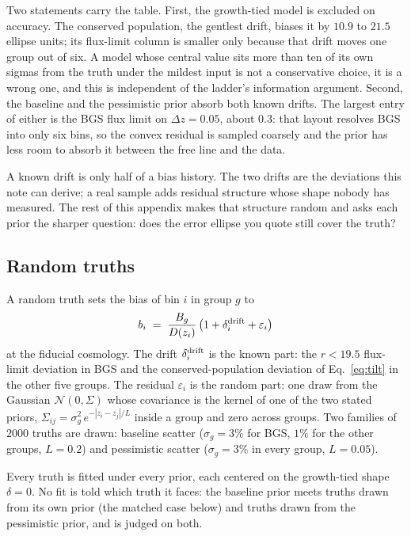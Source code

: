 \documentclass[11pt]{article}
\begin{document}
Two statements carry the table.  First, the growth-tied model is excluded
on accuracy.  The conserved population, the gentlest drift, biases it
by $10.9$ to $21.5$ ellipse units; its flux-limit column is smaller
only because that drift moves one group out of six.  A model whose
central value sits more than ten of its own sigmas from the truth
under the mildest input is not a conservative choice, it is a wrong
one, and this is independent of the ladder's information argument.
Second, the baseline and the pessimistic prior absorb both known
drifts.  The largest entry of either is the BGS flux limit on
$\Delta z = 0.05$, about $0.3$: that layout resolves BGS into only
six bins, so the convex residual is sampled coarsely and the prior
has less room to absorb it between the free line and the data.

A known drift is only half of a bias history.  The two drifts are
the deviations this note can derive; a real sample adds residual
structure whose shape nobody has measured.  The rest of this
appendix makes that structure random and asks each prior the sharper
question: does the error ellipse you quote still cover the truth?

\subsection{Random truths}
\label{sec:randomtruths}

A random truth sets the bias of bin $i$ in group $g$ to
\begin{equation}
  b_i \;=\; \frac{B_g}{D(z_i)}\,
  \bigl(1 + \delta_i^{\rm drift} + \varepsilon_i\bigr)
  \label{eq:randomtruth}
\end{equation}
at the fiducial cosmology.  The drift $\delta_i^{\rm drift}$ is the
known part: the $r < 19.5$ flux-limit deviation in BGS and the
conserved-population deviation of Eq.~\eqref{eq:tilt} in the other
five groups.  The residual $\varepsilon_i$ is the random part: one
draw from the Gaussian $\mathcal{N}(0, \Sigma)$ whose covariance is
the kernel of one of the two stated priors,
$\Sigma_{ij} = \sigma_g^2\, e^{-|z_i - z_j|/L}$ inside a group and
zero across groups.  Two families of $2000$ truths are drawn:
baseline scatter ($\sigma_g = 3\%$ for BGS, $1\%$ for the other
groups, $L = 0.2$) and pessimistic scatter ($\sigma_g = 3\%$ in
every group, $L = 0.05$).

Every truth is fitted under every prior, each centered on the
growth-tied shape $\delta = 0$.  No fit is told which truth it
faces: the baseline prior meets truths drawn from its
own prior (the matched case below) and truths drawn from the
pessimistic prior, and is judged on both.
\end{document}
